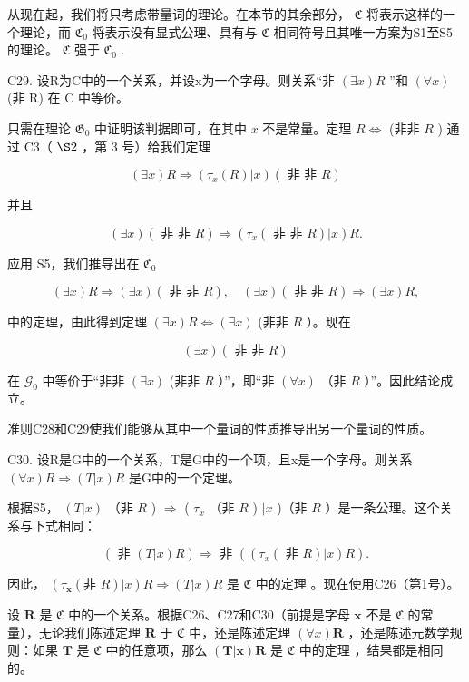 从现在起，我们将只考虑带量词的理论。在本节的其余部分， \(\mathfrak{C}\) 将表示这样的一个理论，而 \(\mathfrak{C}_0\) 将表示没有显式公理、具有与 \(\mathfrak{C}\) 相同符号且其唯一方案为S1至S5的理论。 \(\mathfrak{C}\) 强于 \(\mathfrak{C}_0\) .

C29. 设R为C中的一个关系，并设x为一个字母。则关系“非 \((\exists x)R\) ”和 \((\forall x)\) (非 R) 在 C 中等价。

只需在理论 \(\mathfrak{G}_0\) 中证明该判据即可，在其中 \(x\) 不是常量。定理 \(R \Longleftrightarrow\) (非非 \(R\) ) 通过 C3（ \(\S 2\) ，第 3 号）给我们定理

\[
(\exists x) R \Longrightarrow (\tau_ {x} (R) | x) (\text { 非   非 } R)
\]

并且

\[
(\exists x) (\text { 非   非 } R) \Longrightarrow (\tau_ {x} (\text { 非   非 } R) | x) R.
\]

应用 S5，我们推导出在 \(\mathfrak{C}_{0}\)

\[
(\exists x) R \Longrightarrow (\exists x) (\text { 非   非 } R), \quad (\exists x) (\text { 非   非 } R) \Longrightarrow (\exists x) R,
\]

中的定理，由此得到定理 \((\exists x)R \Longleftrightarrow (\exists x)\) (非非 \(R\) ）。现在

\[
(\exists x) (\text { 非   非 } R)
\]

在 \(\mathcal{G}_0\) 中等价于“非非 \((\exists x)\) (非非 \(R\) ）”，即“非 \((\forall x)\) （非 \(R\) ）”。因此结论成立。

准则C28和C29使我们能够从其中一个量词的性质推导出另一个量词的性质。

C30. 设R是G中的一个关系，T是G中的一个项，且x是一个字母。则关系 \((\forall x)R \Longrightarrow (T|x)R\) 是G中的一个定理。

根据S5， \((T|x)\) （非 \(R\) ) \(\Longrightarrow\) ( \(\tau_{x}\) （非 \(R\) ) \(|x\) )（非 \(R\) ）是一条公理。这个关系与下式相同：

\[
(\text { 非 } (T | x) R) \Longrightarrow \text { 非 } ((\tau_ {x} (\text { 非 } R) | x) R).
\]

因此， \((\tau_{\mathbf{x}}(\text{非 } R)|x)R \Longrightarrow (T|x)R\) 是 \(\mathfrak{C}\) 中的定理 。现在使用C26（第1号）。

设 \(\pmb{R}\) 是 \(\mathfrak{C}\) 中的一个关系。根据C26、C27和C30（前提是字母 \(\pmb{x}\) 不是 \(\mathfrak{C}\) 的常量），无论我们陈述定理 \(\pmb{R}\) 于 \(\mathfrak{C}\) 中，还是陈述定理 \((\forall x)\pmb{R}\) ，还是陈述元数学规则：如果 \(\pmb{T}\) 是 \(\mathfrak{C}\) 中的任意项，那么 \((\pmb{T}|\pmb{x})\pmb{R}\) 是 \(\mathfrak{C}\) 中的定理 ，结果都是相同的。

